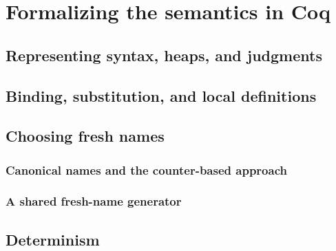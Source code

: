 \chapter{Formalizing the semantics in Coq}
\label{chap:formalization}

\section{Representing syntax, heaps, and judgments}

\section{Binding, substitution, and local definitions}

\section{Choosing fresh names}
\label{sec:freshness}

\subsection{Canonical names and the counter-based approach}

\subsection{A shared fresh-name generator}

\section{Determinism}
